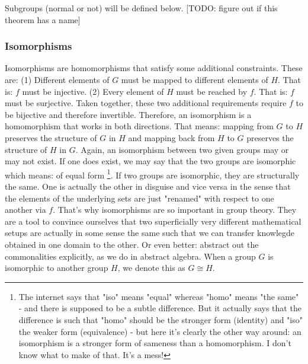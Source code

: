 \medskip Subgroups (normal or not) will be defined below.
[TODO: figure out if this theorem has a name]



\subsubsection{Isomorphisms}
Isomorphisms are homomorphisms that satisfy some additional constraints. These are: (1) Different elements of $G$ must be mapped to different elements of $H$. That is: $f$ must be injective. (2) Every element of $H$ must be reached by $f$. That is: $f$ must be surjective. Taken together, these two additional requirements require $f$ to be bijective and therefore invertible. Therefore, an isomorphism is a homomorphism that works in both directions. That means: mapping from $G$ to $H$ preserves the structure of $G$ in $H$ and mapping back from $H$ to $G$ preserves the structure of $H$ in $G$. Again, an isomorphism between two given groups may or may not exist. If one does exist, we may say that the two groups are isomorphic which means: of equal form \footnote{The internet says that "iso" means "equal" whereas "homo" means "the same" - and there is supposed to be a subtle difference. But it actually says that the difference is such that "homo" should be the stronger form (identity) and "iso" the weaker form (equivalence) - but here it's clearly the other way around: an isomorphism is a stronger form of sameness than a homomorphism. I don't know what to make of that. It's a mess!}. If two groups are isomorphic, they are structurally the same. One is actually the other in disguise and vice versa in the sense that the elements of the underlying sets are just "renamed" with respect to one another via $f$. That's why isomorphisms are so important in group theory. They are a tool to convince ourselves that two superficially very different mathematical setups are actually in some sense the same such that we can transfer knowlegde obtained in one domain to the other. Or even better: abstract out the commonalities explicitly, as we do in abstract algebra. When a group $G$ is isomorphic to another group $H$, we denote this as $G \cong H$.

